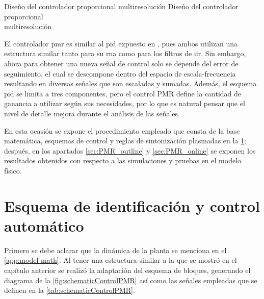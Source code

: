 \initchapterlong
    {Diseño del controlador proporcional multiresolución}
    {Diseño del controlador proporcional \\multiresolución}\label{chap:pmr ctrl}


El controlador \acrfull{pmr} es similar al \acrfull{pid} expuesto en  \cite{GarciaCastro2020}, pues ambos utilizan una estructura similar tanto para su \acrlong{rna} como para los filtros de \acrfull{iir}. Sin embargo, ahora para obtener una nueva señal de control solo se depende del error de seguimiento, el cual se descompone dentro del espacio de escala-frecuencia resultando en diversas señales que son escaladas y sumadas. Además, el esquema \acrshort{pid} se limita a tres componentes, pero el control PMR define la cantidad de ganancia a utilizar según sus necesidades, por lo que es natural pensar que el nivel de detalle mejora durante el análisis de las señales.

En esta ocasión se expone el procedimiento empleado que consta de la base matemática, esquemas de control y reglas de sintonización plasmadas en la \cref{sec:PMR_control}; después, en los apartados \ref{sec:PMR_outline} y \ref{sec:PMR_online} se exponen los resultados obtenidos con respecto a las simulaciones y pruebas en el modelo físico.

\section{Esquema de identificación y control automático}\label{sec:PMR_control}
    
    Primero se debe aclarar que la dinámica de la planta se menciona en el \cref{app:model math}. Al tener una estructura similar a la que se mostró en el capítulo anterior se realizó la adaptación del esquema de bloques, generando el diagrama de la \cref{fig:schematicControlPMR} así como las señales empleadas que se definen en la \cref{tab:schematicControlPMR}.
        
